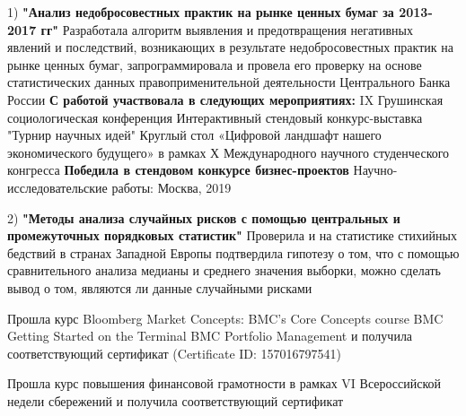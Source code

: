 \documentclass[]{awesome-cv}
\begin{document}
\vspace{-9mm}
\begin{cventries}
	\cventry
	{1) \textbf{"Анализ  недобросовестных практик на рынке ценных бумаг за 2013-2017 гг"}
	\newline \qquad \bullet  Разработала алгоритм выявления и предотвращения негативных явлений и последствий, возникающих в результате недобросовестных практик на рынке ценных бумаг, запрограммировала и провела его проверку на основе статистических данных правоприменительной деятельности Центрального Банка России
	\newline 
	\textbf{С работой участвовала в следующих мероприятиях:}
	\newline \quad IX Грушинская социологическая конференция  
	\newline \quad Интерактивный стендовый конкурс-выставка "Турнир научных идей"  
	\newline \quad Круглый стол «Цифровой ландшафт нашего экономического будущего» в рамках Х 
	\newline \quad Международного научного студенческого конгресса
	\newline \textbf{Победила в стендовом конкурсе бизнес-проектов} } 
	{Научно-исследовательские работы:}
	{Москва, 2019}
	{}
	{}
		\end{cventries}  \vspace{-6mm} \begin{cventries}
	\cventry
	{2) \textbf{"Методы анализа случайных рисков с помощью центральных и 
промежуточных порядковых статистик"}
	\newline \qquad \bullet Проверила и на статистике стихийных бедствий в странах Западной Европы подтвердила гипотезу о том, что с помощью сравнительного анализа медианы и среднего значения выборки, можно сделать вывод о том, являются ли данные случайными рисками
	}
	{}%
	{}
	{}
	{}
	\vspace{-5mm}
\end{cventries}


\begin{cventries}
	\cventry
		{}
	{Прошла курс Bloomberg Market Concepts:
	\newline \quad \bullet BMC's Core Concepts course
	\newline \quad \bullet BMC Getting Started on the Terminal
	\newline \quad \bullet BMC Portfolio Management
	\newline \quad и получила соответствующий сертификат (Certificate ID: 157016797541)}
	{}
	{}
	{}
	\end{cventries} \vspace{-6mm} \begin{cventries}
	\cventry
{}
	{Прошла курс повышения финансовой грамотности в рамках VI Всероссийской недели сбережений и получила соответствующий сертификат}
	{}
	{}
	{}
	\end{cventries} 
	\vspace{-7mm}
	
\end{document}
